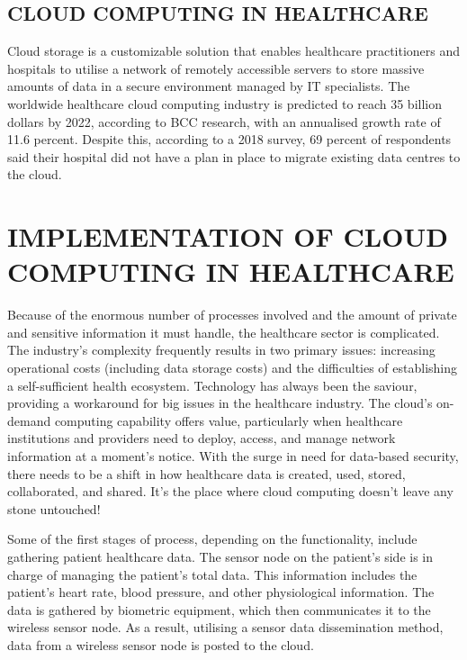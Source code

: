 \documentclass[12pt]{article}
\begin{document}
\subsection{CLOUD COMPUTING IN HEALTHCARE}

Cloud storage is a customizable solution that enables healthcare practitioners and hospitals to utilise a network of remotely accessible servers to store massive amounts of data in a secure environment managed by IT specialists. The worldwide healthcare cloud computing industry is predicted to reach 35 billion dollars by 2022, according to BCC research, with an annualised growth rate of 11.6 percent. Despite this, according to a 2018 survey, 69 percent of respondents said their hospital did not have a plan in place to migrate existing data centres to the cloud.

\section{IMPLEMENTATION OF CLOUD COMPUTING IN HEALTHCARE}

Because of the enormous number of processes involved and the amount of private and sensitive information it must handle, the healthcare sector is complicated. The industry's complexity frequently results in two primary issues: increasing operational costs (including data storage costs) and the difficulties of establishing a self-sufficient health ecosystem. Technology has always been the saviour, providing a workaround for big issues in the healthcare industry. The cloud's on-demand computing capability offers value, particularly when healthcare institutions and providers need to deploy, access, and manage network information at a moment's notice. With the surge in need for data-based security, there needs to be a shift in how healthcare data is created, used, stored, collaborated, and shared. It's the place where cloud computing doesn't leave any stone untouched!

\indent
Some of the first stages of process, depending on the functionality, include gathering patient healthcare data. The sensor node on the patient's side is in charge of managing the patient's total data. This information includes the patient's heart rate, blood pressure, and other physiological information. The data is gathered by biometric equipment, which then communicates it to the wireless sensor node. As a result, utilising a sensor data dissemination method, data from a wireless sensor node is posted to the cloud.
\end{document}
